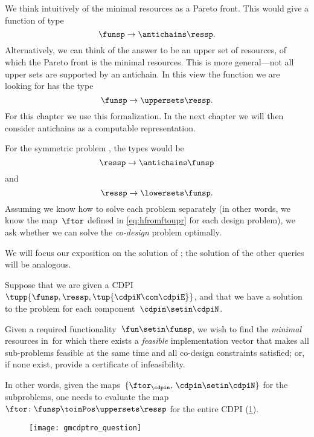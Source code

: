We think intuitively of the minimal resources as a Pareto front.
This would give a function of type
\begin{equation}
    \funsp \to \antichains\ressp.
\end{equation}
Alternatively, we can think of the answer to be an upper set of resources, of which the Pareto front is the minimal resources.
This is more general---not all upper sets are supported by an antichain.
In this view the function we are looking for has the type
\begin{equation}
    \funsp \to \uppersets\ressp.
\end{equation}
For this chapter we use this formalization.
In the next chapter we will then consider antichains as a computable representation.

For the symmetric problem \FixResMaxFun, the types would be
\begin{equation}
    \ressp \to \antichains\funsp
\end{equation}
and
\begin{equation}
    \ressp \to \lowersets\funsp.
\end{equation}
%
Assuming we know how to solve each problem separately (in other words, we know the map~$\ftor$ defined in \cref{eq:hfromftoupr} for each design problem), we ask whether we can solve the \emph{co-design} problem optimally.

We will focus our exposition on the solution of \FixFunMinRes; the solution of the other queries will be analogous.

\begin{problem}
\label{prob:MCDP}
Suppose that we are given a CDPI~$\tupp{ \funsp,\ressp, \tup{ \cdpiN \com \cdpiE} }$, and that we have a solution to the \FixFunMinRes problem for each component~$\cdpin\setin\cdpiN$.

Given a required functionality~$\fun\setin\funsp$, we wish to find the \emph{minimal} resources in~\ressp for which there exists a \emph{feasible} implementation vector that makes all sub-problems feasible at the same time and all co-design constraints satisfied; or, if none exist, provide a certificate of infeasibility.
\end{problem}
In other words, given the maps~$\{\ftor_{\cdpin},\,\cdpin\setin\cdpiN\}$ for the subproblems, one needs to evaluate  the map~$\ftor\colon\funsp \toinPos \uppersets \ressp$ for the entire CDPI (\cref{fig:question}).

\begin{figure}
    \texttt{[image: gmcdptro\_question]}
    \caption{}
    \label{fig:question}
\end{figure}

